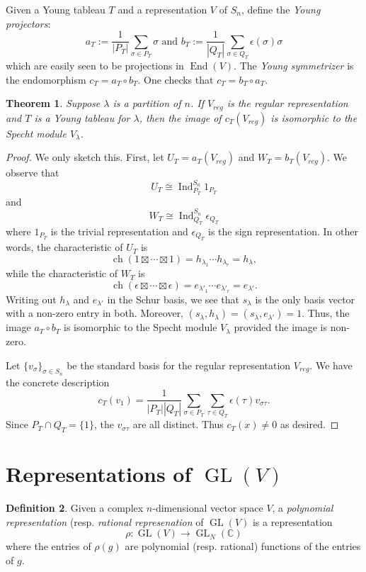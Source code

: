\documentclass[12pt]{article}
\theoremstyle{plain}
\newtheorem{theorem}{Theorem}[section]
\theoremstyle{definition}
\newtheorem{definition}[theorem]{Definition}
\theoremstyle{remark}
\numberwithin{equation}{section}
\begin{document}
Given a Young tableau $T$ and a representation $V$ of $S_n$,
define the \emph{Young projectors}:
\[
a_T := \frac{1}{|P_T|}\sum_{\sigma \in P_T} \sigma
\textrm{ and }
b_T := \frac{1}{|Q_T|}\sum_{\sigma \in Q_T} \epsilon(\sigma)\sigma
\]
which are easily seen to be projections in $\operatorname{End}(V)$.
The \emph{Young symmetrizer} is the endomorphism $c_T = a_T \circ b_T$.
One checks that $c_T = b_T \circ a_T$.

\begin{theorem}
Suppose $\lambda$ is a partition of $n$.
If $V_{reg}$ is the regular representation and $T$ is a Young tableau
for $\lambda$, then the image of $c_T(V_{reg})$ is isomorphic to the
Specht module $V_\lambda$.
\end{theorem}

\begin{proof}
We only sketch this.
First, let $U_T = a_T(V_{reg})$ and $W_T = b_T(V_{reg})$.
We observe that
\[
U_T \cong \operatorname{Ind}_{P_T}^{S_n} 1_{P_T}
\]
and
\[
W_T \cong \operatorname{Ind}_{Q_T}^{S_n} \epsilon_{Q_T}
\]
where $1_{P_T}$ is the trivial representation and $\epsilon_{Q_T}$ is the sign
representation.
In other words, the characteristic of $U_T$ is
\[
\operatorname{ch}(1 \boxtimes \cdots \boxtimes 1)
= h_{\lambda_1} \cdots h_{\lambda_r} = h_\lambda,
\]
while the characteristic of $W_T$ is
\[
\operatorname{ch}(\epsilon \boxtimes \cdots \boxtimes \epsilon)
= e_{\lambda'_1} \cdots e_{\lambda'_r} = e_{\lambda'}.
\]
Writing out $h_\lambda$ and $e_{\lambda'}$ in the Schur basis,
we see that $s_\lambda$ is the only basis vector with a non-zero entry
in both.
Moreover, $(s_\lambda,h_\lambda)=(s_\lambda,e_{\lambda'})=1$.
Thus, the image $a_T \circ b_T$ is isomorphic to the Specht module
$V_\lambda$ provided the image is non-zero.

Let $\{ v_\sigma \}_{\sigma \in S_n}$ be the standard basis for the regular
representation $V_{reg}$.
We have the concrete description
\[
c_T(v_{1})  = \frac{1}{|P_T| |Q_T|}\sum_{\sigma \in P_T}\sum_{\tau \in Q_T}
\epsilon(\tau) v_{\sigma\tau} .
\]
Since $P_T \cap Q_T = \{1\}$, the $v_{\sigma\tau}$ are all distinct.
Thus $c_T(x) \ne 0$ as desired.
\end{proof}

\section{Representations of $\operatorname{GL}(V)$}

\begin{definition}
Given a complex $n$-dimensional vector space $V$,
a \emph{polynomial representation} (resp. \emph{rational represenation} of
$\operatorname{GL}(V)$ is a representation
\[
\rho : \operatorname{GL}(V) \to \operatorname{GL}_N(\mathbb{C})
\]
where the entries of $\rho(g)$ are polynomial (resp. rational)
functions of the entries of $g$.
\end{definition}
\end{document}
